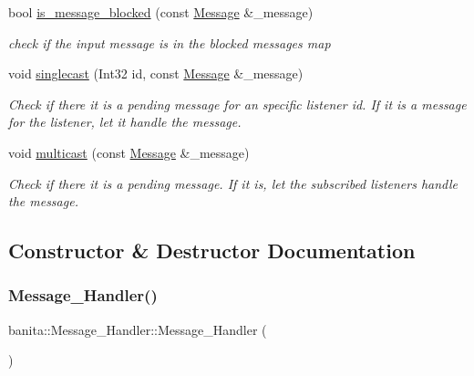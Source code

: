 \begin{DoxyCompactItemize}
\item 
bool \mbox{\hyperlink{classbanita_1_1_message___handler_a9aa44b5857d36ea645f7c1d6631f299e}{is\+\_\+message\+\_\+blocked}} (const \mbox{\hyperlink{classbanita_1_1_message}{Message}} \&\+\_\+message)
\begin{DoxyCompactList}\small\item\em check if the input message is in the blocked messages map \end{DoxyCompactList}\item 
void \mbox{\hyperlink{classbanita_1_1_message___handler_a689c5f2971747e4b7c9e3b5a678adf52}{singlecast}} (Int32 id, const \mbox{\hyperlink{classbanita_1_1_message}{Message}} \&\+\_\+message)
\begin{DoxyCompactList}\small\item\em Check if there it is a pending message for an specific listener id. If it is a message for the listener, let it handle the message. \end{DoxyCompactList}\item 
void \mbox{\hyperlink{classbanita_1_1_message___handler_a66509928c2131bf12c35192aead8c327}{multicast}} (const \mbox{\hyperlink{classbanita_1_1_message}{Message}} \&\+\_\+message)
\begin{DoxyCompactList}\small\item\em Check if there it is a pending message. If it is, let the subscribed listeners handle the message. \end{DoxyCompactList}\end{DoxyCompactItemize}


\subsection{Constructor \& Destructor Documentation}
\mbox{\label{classbanita_1_1_message___handler_ab610f5ffc535a86ed43c24323277225c}} 
\subsubsection{\texorpdfstring{Message\_Handler()}{Message\_Handler()}}
{\footnotesize\ttfamily banita\+::\+Message\+\_\+\+Handler\+::\+Message\+\_\+\+Handler (\begin{DoxyParamCaption}{ }\end{DoxyParamCaption})\hspace{0.3cm}{\ttfamily [inline]}}



